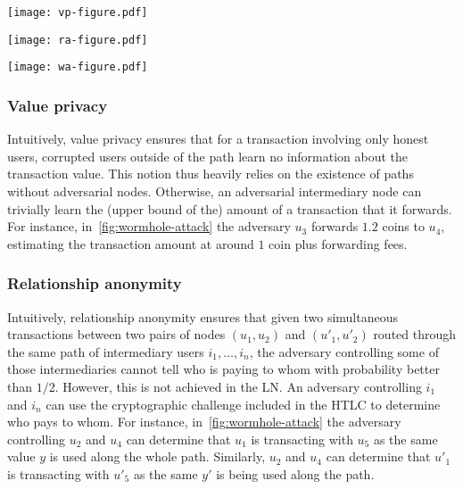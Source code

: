 \begin{figure*}[tb]
	\texttt{[image: vp-figure.pdf]}
	
	\vspace{0.3cm}
	
	\texttt{[image: ra-figure.pdf]}
	
	\vspace{0.3cm}
	
	\texttt{[image: wa-figure.pdf]}
	
	\caption{\label{fig:wormhole-attack} An illustrative example of value privacy (top), relationship anonymity (middle), and the wormhole attack (bottom).}
\end{figure*}

\subsubsection{Value privacy~\cite{Malavolta2017}}
Intuitively, value privacy ensures that for a transaction involving only honest users, 
corrupted users outside of the path learn no information about the transaction value.
This notion thus heavily relies on the existence of paths without adversarial nodes.  
Otherwise, an adversarial intermediary node can trivially learn the (upper bound of the) amount of a transaction that it forwards. 
For instance, in~\cref{fig:wormhole-attack} the adversary $u_3$
forwards $1.2$ coins to $u_4$, estimating the transaction amount at around $1$ coin plus forwarding fees.

\subsubsection{Relationship anonymity~\cite{Malavolta2017}}
Intuitively, relationship anonymity ensures that given two simultaneous transactions 
between two pairs of nodes $(u_1, u_2)$ and $(u'_1, u'_2)$ routed through the same path of intermediary 
users $i_1, \ldots, i_n$, the adversary controlling some of those intermediaries cannot tell who is paying to whom with probability better than $1/2$.
However, this is not achieved in the LN.
An adversary controlling $i_1$ and $i_n$ can use the cryptographic challenge included in the HTLC to 
determine who pays to whom.
For instance, in~\cref{fig:wormhole-attack} the adversary controlling $u_2$ 
and $u_4$ can determine that $u_1$ is transacting with $u_5$ as the same value $y$ is used along the whole path. 
Similarly, $u_2$ and $u_4$ can determine that $u'_1$ is transacting with $u'_5$ as the same $y'$ is being used along the path. 

